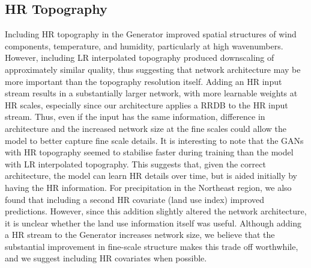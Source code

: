 \documentclass{ametsocV6.1}
\begin{document}
\subsection{HR Topography}
Including HR topography in the Generator improved spatial structures of wind components, temperature, and humidity, particularly at high wavenumbers. However, including LR interpolated topography produced downscaling of approximately similar quality, thus suggesting that network architecture may be more important than the topography resolution itself. Adding an HR input stream results in a substantially larger network, with more learnable weights at HR scales, especially since our architecture applies a RRDB to the HR input stream. Thus, even if the input has the same information, difference in architecture and the increased network size at the fine scales could allow the model to better capture fine scale details. It is interesting to note that the GANs with HR topography seemed to stabilise faster during training than the model with LR interpolated topography. This suggests that, given the correct architecture, the model can learn HR details over time, but is aided initially by having the HR information. For precipitation in the Northeast region, we also found that including a second HR covariate (land use index) improved predictions. However, since this addition slightly altered the network architecture, it is unclear whether the land use information itself was useful. Although adding a HR stream to the Generator increases network size, we believe that the substantial improvement in fine-scale structure makes this trade off worthwhile, and we suggest including HR covariates when possible.
\end{document}
